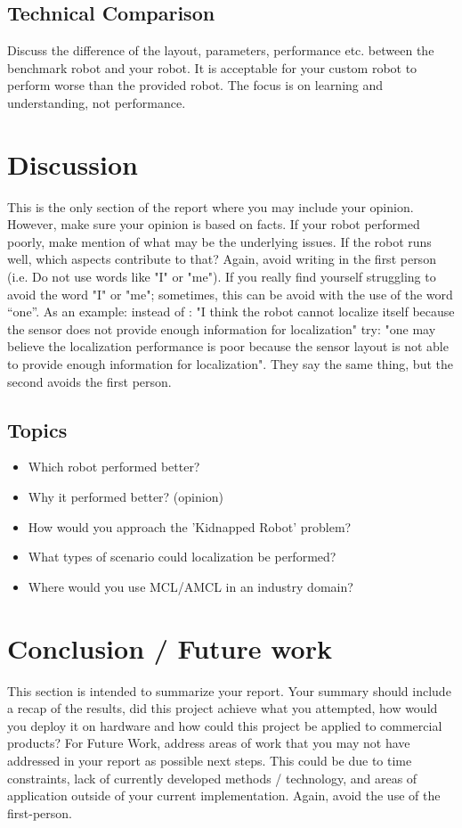 \documentclass[10pt,journal,compsoc]{IEEEtran}
\begin{document}
\subsection{Technical Comparison} %
Discuss the difference of the layout, parameters, performance etc. between the benchmark robot and your robot. It is acceptable for your custom robot to perform worse than the provided robot. The focus is on learning and understanding, not performance. 

\section{Discussion}
This is the only section of the report where you may include your opinion. However, make sure your opinion is based on facts. If your robot performed poorly, make mention of what may be the underlying issues. If the robot runs well, which aspects contribute to that? Again, avoid writing in the first person (i.e. Do not use words like "I" or "me"). If you really find yourself struggling to avoid the word "I" or "me"; sometimes, this can be avoid with the use of the word “one”. As an example: instead of : "I think the robot cannot localize itself because the sensor does not provide enough information for localization" try: "one may believe the localization performance is poor because the sensor layout is not able to provide enough information for localization". They say the same thing, but the second avoids the first person. 

\subsection{Topics}
\begin{itemize}
\item Which robot performed better?
\item Why it performed better? (opinion)
\item How would you approach the 'Kidnapped Robot' problem?
\item What types of scenario could localization be performed?
\item Where would you use MCL/AMCL in an industry domain?
\end {itemize}

\section{Conclusion / Future work}
This section is intended to summarize your report. Your summary should include a recap of the results, did this project achieve what you attempted, how would you deploy it on hardware and how could this project be applied to commercial products? 
For Future Work, address areas of work that you may not have addressed in your report as possible next steps. This could be due to time constraints, lack of currently developed methods / technology, and areas of application outside of your current implementation. Again, avoid the use of the first-person.
\end{document}
